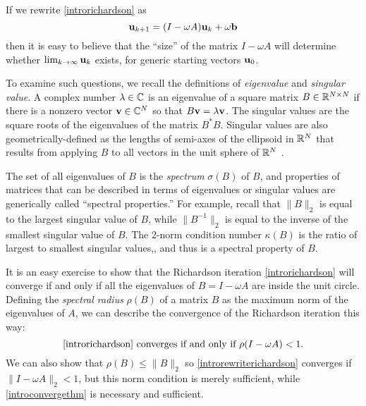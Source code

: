 If we rewrite \eqref{introrichardson} as
\begin{equation}
\mathbf{u}_{k+1} = (I - \omega A) \mathbf{u}_k + \omega \mathbf{b}  \label{introrewriterichardson}
\end{equation}
then it is easy to believe that the ``size'' of the matrix $I-\omega A$ will determine whether $\lim_{k\to\infty} \mathbf{u}_k$ exists, for generic starting vectors $\mathbf{u}_0$.

To examine such questions, we recall the definitions of \emph{eigenvalue} and \emph{singular value}.  A complex number $\lambda \in \mathbb{C}$ is an eigenvalue of a square matrix $B\in\mathbb{R}^{N\times N}$ if there is a nonzero vector $\mathbf{v}\in\mathbb{C}^N$ so that $B \mathbf{v} = \lambda \mathbf{v}$.    The singular values are the square roots of the eigenvalues of the matrix $B^*B$.  Singular values are also geometrically-defined as the lengths of semi-axes of the ellipsoid in $\mathbb{R}^N$ that results from applying $B$ to all vectors in the unit sphere of $\mathbb{R}^N$ \citep{TrefethenBau}.

The set of all eigenvalues of $B$ is the \emph{spectrum} $\sigma(B)$ of $B$, and properties of matrices that can be described in terms of eigenvalues or singular values are generically called ``spectral properties.''  For example, recall that $\|B\|_2$ is equal to the largest singular value of $B$, while $\|B^{-1}\|_2$ is equal to the inverse of the smallest singular value of $B$.  The 2-norm condition number $\kappa(B)$ is the ratio of largest to smallest singular values,, and thus is a spectral property of $B$.

It is an easy exercise to show that the Richardson iteration \eqref{introrichardson} will converge if and only if all the eigenvalues of $B=I-\omega A$ are inside the unit circle.  Defining the \emph{spectral radius} $\rho(B)$ of a matrix $B$ as the maximum norm of the eigenvalues of $A$, we can describe the convergence of the Richardson iteration this way:
\begin{equation}
\text{\eqref{introrichardson} converges if and only if } \rho(I-\omega A) < 1. \label{introconvergethm}
\end{equation}
We can also show that $\rho(B) \le \|B\|_2$ so \eqref{introrewriterichardson} converges if $\|I-\omega A\|_2 < 1$, but this norm condition is merely sufficient, while \eqref{introconvergethm} is necessary and sufficient.


